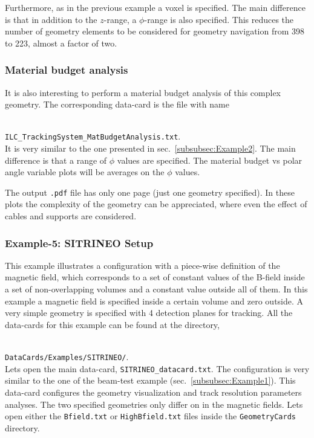 Furthermore, as in the previous example a voxel is specified. The main difference is that in addition to the $z$-range, a $\phi$-range is also specified. This reduces the number of geometry elements 
to be considered for geometry navigation from 398 to 223, almost a factor of two.

\subsubsection*{Material budget analysis}

It is also interesting to perform a material budget analysis of this complex geometry. The corresponding data-card is the file with name

~\\
{\small {\tt ILC\_TrackingSystem\_MatBudgetAnalysis.txt}}.
~\\

\noindent
It is very similar to the one presented in sec.~\ref{subsubsec:Example2}. The main difference is that a range of $\phi$ values are specified. The 
material budget vs polar angle variable plots will be averages on the $\phi$ values.

The output {\tt .pdf} file has only one page (just one geometry specified). In these plots the complexity of the geometry can be appreciated, where 
even the effect of cables and supports are considered. 

\subsubsection{Example-5: SITRINEO Setup}
\label{subsubsec:Example5}

This example illustrates a configuration with a piece-wise definition of the magnetic field, which corresponds to a set of constant values of the B-field inside a set of 
non-overlapping volumes and a constant value outside all of them. In this example a magnetic field is specified inside a certain 
volume and zero outside. A very simple geometry is specified with 4 detection planes for tracking. All the data-cards for this example can be found at the 
directory, 

~\\
{\tt DataCards/Examples/SITRINEO/}.
~\\

\noindent
Lets open the main data-card, {\tt SITRINEO\_datacard.txt}. The configuration is very similar to the one of the beam-test example (sec.~\ref{subsubsec:Example1}). 
This data-card configures the geometry visualization and track resolution parameters analyses. The two specified geometries only differ on in the 
magnetic fields. Lets open either the {\tt Bfield.txt} or {\tt HighBfield.txt} files inside the {\tt GeometryCards} directory.

